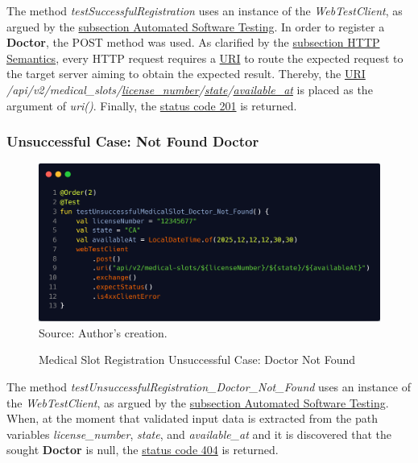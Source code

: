 The method \textit{testSuccessfulRegistration} uses an instance of the \textit{WebTestClient}, as argued by the \hyperref[subsection:automated_software_testing]{subsection Automated Software Testing}. In order to register a \textbf{Doctor}, the POST method was used. As clarified by the \hyperref[subsection:http_semantics]{subsection HTTP Semantics}, every HTTP request requires a \hyperref[appendix:glossary]{URI} to route the expected request to the target server aiming to obtain the expected result. Thereby, the \hyperref[appendix:glossary]{URI} \textit{/api/v2/medical\_slots/\underline{license\_number}/\underline{state}/\underline{available\_at}} is placed as the argument of \textit{uri()}. Finally, the \hyperref[tab:summary_http_status_codes]{status code 201} is returned.

\subsubsection{Unsuccessful Case: Not Found Doctor}

\begin{figure}[H]
	\centering
	\caption{Medical Slot Registration Unsuccessful Case: Doctor Not Found}
	\includegraphics[width=1\linewidth]{figures/medical_slot_registration_unsuccessful_integration_test_doctor_not_found.png}
	\footnotesize Source: Author's creation.
	\label{fig:medical_slot_registration_unsuccessful_integration_test_doctor_not_found}
\end{figure}

The method \textit{testUnsuccessfulRegistration\_Doctor\_Not\_Found} uses an instance of the \textit{WebTestClient}, as argued by the \hyperref[subsection:automated_software_testing]{subsection Automated Software Testing}. When, at the moment that validated input data is extracted from the path variables \textit{license\_number}, \textit{state}, and \textit{available\_at} and it is discovered that the sought \textbf{Doctor} is null, the \hyperref[tab:summary_http_status_codes]{status code 404} is returned.

